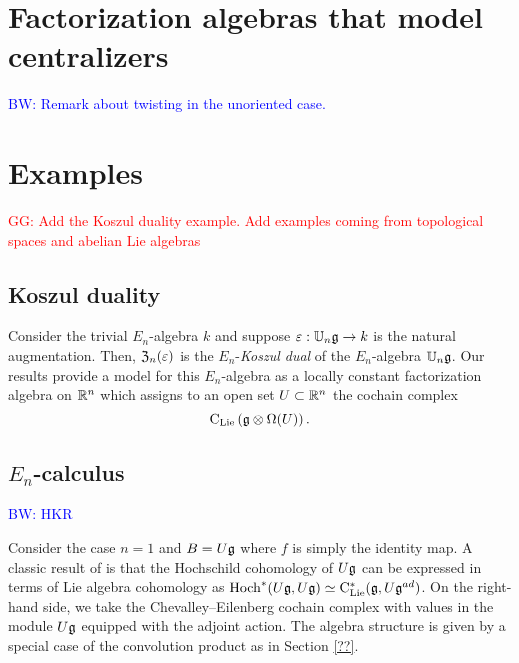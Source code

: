 \documentclass[11pt]{amsart}
\numberwithin{equation}{section}
\def\brian{\textcolor{blue}{BW: }\textcolor{blue}}
\def\greg{\textcolor{red}{GG: }\textcolor{red}}
\begin{document}
%
%

\section{Factorization algebras that model centralizers}

\brian{Remark about twisting in the unoriented case.}

\section{Examples}


\greg{Add the Koszul duality example. Add examples coming from topological spaces and abelian Lie algebras}

\subsection{Koszul duality}
\label{sec: Koszul}

Consider the trivial $E_n$-algebra $k$ and suppose $\varepsilon : \mathbb U_n \mathfrak g \to k$ is the natural augmentation. 
Then, ${\frak Z}_n (\varepsilon)$ is the $E_n$-{\em Koszul dual} of the $E_n$-algebra $\mathbb U_n \mathfrak g$. 
Our results provide a model for this $E_n$-algebra as a locally constant factorization algebra on $\mathbb R^n$ which assigns to an open set $U \subset \mathbb R^n$ the cochain complex
\[
{\rm C}_{{\rm Lie}} \left(\mathfrak g \otimes \Omega(U) \right) .
\]

\subsection{$E_n$-calculus}
\label{sec: TT}

\brian{HKR}

Consider the case $n=1$ and $B = U \mathfrak g$ where $f$ is simply the identity map. 
A classic result of \cite{HochSerre} is that the Hochschild cohomology of $U \mathfrak g$ can be expressed in terms of Lie algebra cohomology as ${\rm Hoch}^*(U\mathfrak g,U\mathfrak g) \simeq {\rm C}_{\rm Lie}^*(\mathfrak g, U\mathfrak g^{ad})$. 
On the right-hand side, we take the Chevalley--Eilenberg cochain complex with values in the module $U \mathfrak g$ equipped with the adjoint action.
The algebra structure is given by a special case of the convolution product as in Section \ref{??}. 
\end{document}
